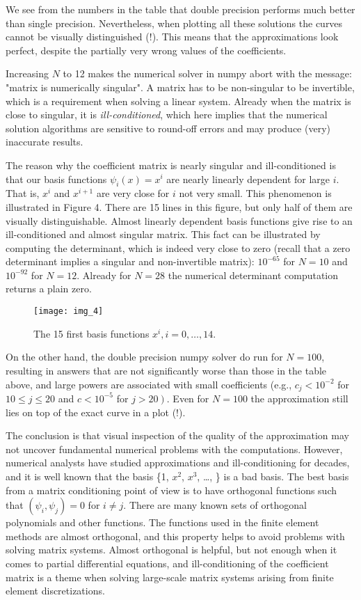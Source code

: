 \documentclass[../main.tex]{subfiles}
\begin{document}
	\noindent We see from the numbers in the table that double precision performs much better than single precision. Nevertheless, when plotting all these solutions the curves cannot be visually distinguished (!). This means that the approximations look perfect, despite the partially very wrong values of the coefficients.
	
	Increasing $N$ to 12 makes the numerical solver in numpy abort with the message: "matrix is numerically singular". A matrix has to be non-singular to be invertible, which is a requirement when solving a linear system. Already when the matrix is close to singular, it is \textit{ill-conditioned}, which here implies that the numerical solution algorithms are sensitive to round-off errors and may produce (very) inaccurate results.
	
	The reason why the coefficient matrix is nearly singular and ill-conditioned is that our basis functions $\psi_{i}(x)=x^{i}$ are nearly linearly dependent for large $i$. That is, $x^{i}$ and $x^{i+1}$ are very close for $i$ not very small. This phenomenon is illustrated in Figure 4. There are 15 lines in this figure, but only half of them are visually distinguishable. Almost linearly dependent basis functions give rise to an ill-conditioned and almost singular matrix. This fact can be illustrated by computing the determinant, which is indeed very close to zero (recall that a zero determinant implies a singular and non-invertible matrix): $10^{-65}$ for $N=10$ and $10^{-92}$ for $N=12$. Already for $N=28$ the numerical determinant computation returns a plain zero.
	\begin{figure}[H]
		\centering
		\texttt{[image: img\_4]}
		\caption{The 15 first basis functions $x^{i}, i=0, \ldots, 14$.}
		\label{fig:img_4}
	\end{figure}
	On the other hand, the double precision numpy solver do run for $N=100$, resulting in answers that are not significantly worse than those in the table above, and large powers are associated with small coefficients (e.g., $c_{j}<10^{-2}$ for $10 \leq j \leq 20$ and $c<10^{-5}$ for $\left.j>20\right)$. Even for $N=100$ the approximation still lies on top of the exact curve in a plot (!).
	
	The conclusion is that visual inspection of the quality of the approximation may not uncover fundamental numerical problems with the computations. However, numerical analysts have studied approximations and ill-conditioning for decades, and it is well known that the basis \{1, $x^{2}$, $x^{3}$, \ldots, \} is a bad basis. The best basis from a matrix conditioning point of view is to have orthogonal functions such that $\left(\psi_{i}, \psi_{j}\right)=0$ for $i \neq j$. There are many known sets of orthogonal polynomials and other functions. The functions used in the finite element methods are almost orthogonal, and this property helps to avoid problems with solving matrix systems. Almost orthogonal is helpful, but not enough when it comes to partial differential equations, and ill-conditioning of the coefficient matrix is a theme when solving large-scale matrix systems arising from finite element discretizations.
	\bigbreak
\end{document}
